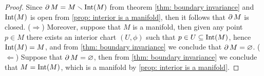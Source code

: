 \begin{proof}
    Since \(\operatorname{\partial} M = M \smallsetminus \operatorname{Int}(M)\) from theorem \cref{thm: boundary
        invariance} and \(\operatorname{Int}(M)\) is open from \cref{prop: interior is a manifold},
    then it follows that \(\operatorname{\partial} M\) is closed. (\(\Rightarrow\)) Moreover,
    suppose that \(M\) is a manifold, then given any point \(p \in M\) there
    exists an interior chart \((U, \phi)\) such that \(p \in U \subseteq
    \operatorname{Int}(M)\), hence \(\operatorname{Int}(M) = M\), and from \cref{thm: boundary invariance} we
    conclude that \(\operatorname{\partial} M = \varnothing\). (\(\Leftarrow\)) Suppose that
    \(\operatorname{\partial} M = \varnothing\), then from \cref{thm: boundary invariance} we
    conclude that \(M = \operatorname{Int}(M)\), which is a manifold by \cref{prop: interior is a
        manifold}.
\end{proof}

